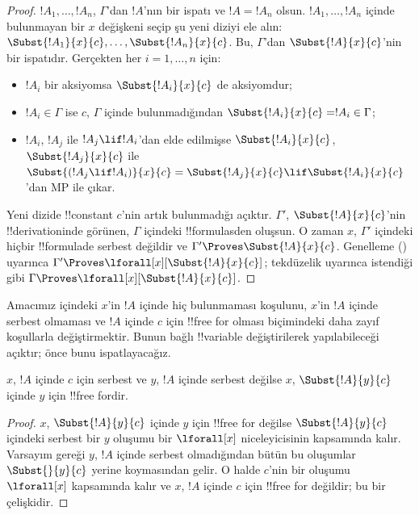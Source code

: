 \begin{proof} $!A_1,\ldots,!A_n$, $\Gamma$'dan $!A$'nın bir ispatı ve
$!A=!A_n$ olsun. $!A_1,\ldots,!A_n$ içinde bulunmayan bir $x$ değişkeni seçip
şu yeni diziyi ele alın:
$\Subst{!A_1}{x}{c},\ldots,\Subst{!A_n}{x}{c}$. Bu, $\Gamma$'dan
$\Subst{!A}{x}{c}$'nin bir ispatıdır. Gerçekten her $i=1,\ldots,n$ için:
\begin{itemize}
\item $!A_i$ bir aksiyomsa $\Subst{!A_i}{x}{c}$ de aksiyomdur;
\item $!A_i \in \Gamma$ ise $c$, $\Gamma$ içinde bulunmadığından
$\Subst{!A_i}{x}{c} = !A_i \in \Gamma$;
\item $!A_i$, $!A_j$ ile $!A_j \lif !A_i$'dan elde edilmişse
$\Subst{!A_i}{x}{c}$, $\Subst{!A_j}{x}{c}$ ile
$\Subst{(!A_j \lif !A_i)}{x}{c} = \Subst{!A_j}{x}{c} \lif
\Subst{!A_i}{x}{c}$'dan MP ile çıkar.
\end{itemize}
Yeni dizide !!{constant} $c$'nin artık bulunmadığı açıktır. $\Gamma'$,
$\Subst{!A}{x}{c}$'nin !!{derivation}{}inde görünen, $\Gamma$ içindeki
!!{formula}s{}den oluşsun. O zaman $x$, $\Gamma'$ içindeki hiçbir !!{formula}{}de
serbest değildir ve $\Gamma' \Proves \Subst{!A}{x}{c}$. Genelleme
() uyarınca
$\Gamma' \Proves \lforall[x][\Subst{!A}{x}{c}]$; tekdüzelik uyarınca
istendiği gibi $\Gamma \Proves \lforall[x][\Subst{!A}{x}{c}]$.
\end{proof}

\begin{explain}
Amacımız  içindeki $x$'in $!A$ içinde hiç bulunmaması
koşulunu, $x$'in $!A$ içinde serbest olmaması ve $!A$ içinde $c$ için
!!{free for} olması biçimindeki daha zayıf koşullarla değiştirmektir. Bunun
bağlı !!{variable} değiştirilerek yapılabileceği açıktır; önce bunu
ispatlayacağız.
\end{explain}

\begin{lem}
$x$, $!A$ içinde $c$ için serbest ve $y$, $!A$ içinde serbest değilse $x$,
$\Subst{!A}{y}{c}$ içinde $y$ için !!{free for}{}dir.
\end{lem}

\begin{proof} $x$, $\Subst{!A}{y}{c}$ içinde $y$ için !!{free for} değilse
$\Subst{!A}{y}{c}$ içindeki serbest bir $y$ oluşumu bir $\lforall[x]$
niceleyicisinin kapsamında kalır. Varsayım gereği $y$, $!A$ içinde serbest
olmadığından bütün bu oluşumlar $\Subst{}{y}{c}$ yerine koymasından gelir.
O halde $c$'nin bir oluşumu $\lforall[x]$ kapsamında kalır ve $x$, $!A$
içinde $c$ için !!{free for} değildir; bu bir çelişkidir.
\end{proof}

